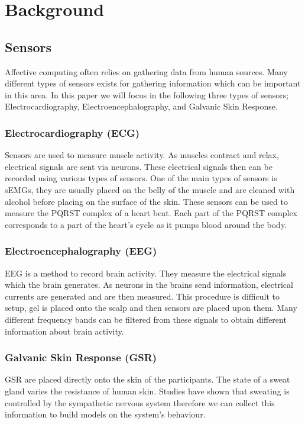 \section{Background}
\label{sec:background}
\subsection{Sensors}
Affective computing often relies on gathering data from human sources.
Many different types of sensors exists for
gathering information which can be important in this area.
In this paper we will focus in the following three types of sensors;
Electrocardiography,
Electroencephalography,
and Galvanic Skin Response.

\subsubsection{Electrocardiography (ECG)}
Sensors are used to measure muscle activity.
As muscles contract and relax,
electrical signals are sent via neurons.
These electrical signals then
can be recorded using various types of sensors.
One of the main types of sensors is sEMGs,
they are usually placed on the belly of the muscle
and are cleaned with alcohol before placing
on the surface of the skin.
These sensors can be used to measure
the PQRST complex of a heart beat.
Each part of the PQRST complex
corresponds to a part of the heart's cycle as it pumps blood around the body.

\subsubsection{Electroencephalography (EEG)}
EEG is a method to record brain activity.
They measure the electrical signals which the brain generates.
As neurons in the brains send information,
electrical currents are generated and are then measured.
This procedure is difficult to setup,
gel is placed onto the scalp and then sensors are placed upon them.
Many different frequency bands can be filtered from these
signals to obtain different information about brain activity.

\subsubsection{Galvanic Skin Response (GSR)}
GSR are placed directly onto the skin of the participants.
The state of a sweat gland varies the resistance of human skin.
Studies have shown that sweating is controlled by the sympathetic nervous system
therefore we can collect this information
to build models on the system's behaviour.

